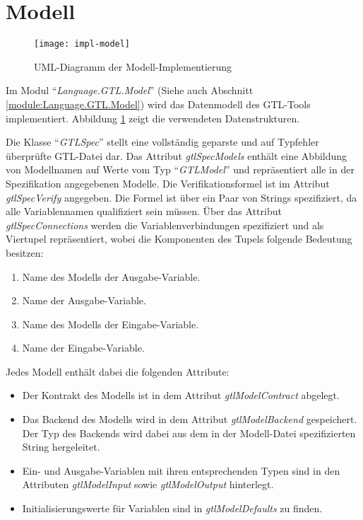 \section{Modell}
\begin{figure}
  \centering
  \texttt{[image: impl-model]}
  \caption{UML-Diagramm der Modell-Implementierung}
  \label{fig:model-impl}
\end{figure}
Im Modul "`\emph{Language.GTL.Model}"' (Siehe auch Abschnitt \ref{module:Language.GTL.Model}) wird das Datenmodell des GTL-Tools implementiert.
Abbildung \ref{fig:model-impl} zeigt die verwendeten Datenstrukturen.

Die Klasse "`\emph{GTLSpec}"' stellt eine vollständig geparste und auf Typfehler überprüfte GTL-Datei dar.
Das Attribut \emph{gtlSpecModels} enthält eine Abbildung von Modellnamen auf Werte vom Typ "`\emph{GTLModel}"' und repräsentiert alle in der Spezifikation angegebenen Modelle.
Die Verifikationsformel ist im Attribut \emph{gtlSpecVerify} angegeben.
Die Formel ist über ein Paar von Strings spezifiziert, da alle Variablennamen qualifiziert sein müssen.
Über das Attribut \emph{gtlSpecConnections} werden die Variablenverbindungen spezifiziert und als Viertupel repräsentiert, wobei die Komponenten des Tupels folgende Bedeutung besitzen:
\begin{enumerate}
\item Name des Modells der Ausgabe-Variable.
\item Name der Ausgabe-Variable.
\item Name des Modells der Eingabe-Variable.
\item Name der Eingabe-Variable.
\end{enumerate}

Jedes Modell enthält dabei die folgenden Attribute:
\begin{itemize}
\item Der Kontrakt des Modells ist in dem Attribut \emph{gtlModelContract} abgelegt.
\item Das Backend des Modells wird in dem Attribut \emph{gtlModelBackend} gespeichert.
  Der Typ des Backends wird dabei aus dem in der Modell-Datei spezifizierten String hergeleitet.
\item Ein- und Ausgabe-Variablen mit ihren entsprechenden Typen sind in den Attributen \emph{gtlModelInput} sowie \emph{gtlModelOutput} hinterlegt.
\item Initialisierungswerte für Variablen sind in \emph{gtlModelDefaults} zu finden.
\end{itemize}
